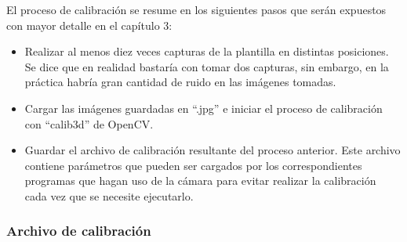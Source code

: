 El proceso de calibración se resume en los siguientes pasos que serán expuestos con mayor detalle en el capítulo 3:
\begin{itemize}
    \item Realizar al menos diez veces capturas de la plantilla en distintas posiciones. Se dice que en realidad bastaría con tomar dos capturas, sin embargo, en la práctica habría gran cantidad de ruido en las imágenes tomadas.
    \item Cargar las imágenes guardadas en ``.jpg'' e iniciar el proceso de calibración con ``calib3d'' de OpenCV.
    \item Guardar el archivo de calibración resultante del proceso anterior. Este archivo contiene parámetros que pueden ser cargados por los correspondientes programas que hagan uso de la cámara para evitar realizar la calibración cada vez que se necesite ejecutarlo.
\end{itemize}

\subsubsection{Archivo de calibración}\label{s2_2_3_2}

